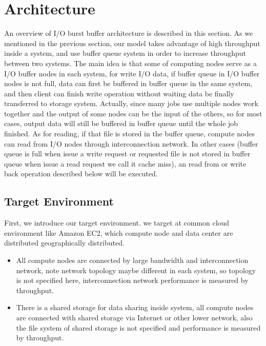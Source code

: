 \section{Architecture}
\label{sec:architecture}

An overview of I/O burst buffer architecture is described in this section.
As we mentioned in the previous section, our model takes advantage of high throughput inside a system, and use buffer queue system in order to increase throughput between two systems.
The main idea is that some of computing nodes serve as a I/O buffer nodes in each system, for write I/O data, if buffer queue in I/O buffer nodes is not full, data can first be buffered in buffer queue in the same system, and then client can finish write operation without waiting data be finally transferred to storage system.
Actually, since many jobs use multiple nodes work together and the output of some nodes can be the
input of the others, so for most cases, output data will still be buffered in buffer queue until the whole job finished.
As for reading, if that file is stored in the buffer queue, compute nodes can read from I/O nodes through interconnection network.
In other cases (buffer queue is full when issue a write request or requested file is not stored in buffer queue when issue a read request we call it cache miss), an read from or write back operation described below will be executed. 

\subsection{Target Environment}
First, we introduce our target environment.
we target at common cloud environment like Amazon EC2, which compute node and data center are distributed geographically distributed.

\begin{itemize}
	\item All compute nodes are connected by large bandwidth and interconnection network, note network topology maybe different in each system, so topology is not specified here, interconnection network performance is measured by throughput.
	\item There is a shared storage for data sharing inside system, all compute nodes are connected
	with shared storage via Internet or other lower network, also the file system of shared storage is not specified and performance is measured by throughput.
\end{itemize}

